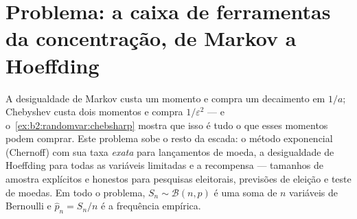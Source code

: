 \section{Problema: a caixa de ferramentas da concentração, de Markov a
Hoeffding}

\begin{problem}
\label{pb:b2:randomvar:1}
A desigualdade de Markov custa um momento e compra um decaimento em $1/a$;
Chebyshev custa dois momentos e compra $1/\varepsilon^2$ ---
e o~\cref{ex:b2:randomvar:chebsharp} mostra que isso é tudo o que esses
momentos podem comprar. Este problema sobe o resto da escada:
o método exponencial (Chernoff) com sua taxa \emph{exata}
para lançamentos de moeda, a desigualdade de Hoeffding para todas as variáveis
limitadas e a recompensa --- tamanhos de amostra explícitos e honestos
para pesquisas eleitorais, previsões de eleição e teste de moedas.
 Em todo o problema, $S_n \sim
\mathcal B(n, p)$ é uma soma de $n$ variáveis de Bernoulli
 e $\widehat p_n = S_n/n$ é a frequência empírica.


\end{problem}
